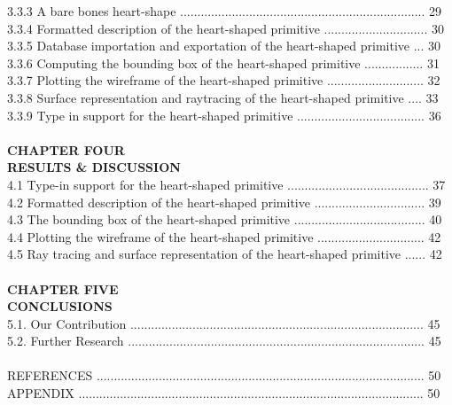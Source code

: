 \documentclass[11pt, oneside]{Thesis} %
\begin{document}
3.3.3 A bare bones heart-shape ....................................................................... 29\\
3.3.4 Formatted description of the heart-shaped primitive .............................. 30\\
3.3.5 Database importation and exportation of the heart-shaped primitive ... 30\\
3.3.6 Computing the bounding box of the heart-shaped primitive ................. 31\\
3.3.7 Plotting the wireframe of the heart-shaped primitive ............................ 32\\
3.3.8 Surface representation and raytracing of the heart-shaped primitive .... 33\\
3.3.9 Type in support for the heart-shaped primitive ..................................... 36\\\\
\hspace*{150}			\textbf{CHAPTER FOUR}\\
\hspace*{125}		 \textbf{RESULTS \& DISCUSSION}\\
4.1 Type-in support for the heart-shaped primitive ......................................... 37\\
4.2 Formatted description of the heart-shaped primitive ................................ 39\\
4.3 The bounding box of the heart-shaped primitive ......................................  40\\
4.4 Plotting the wireframe of the heart-shaped primitive ............................... 42\\
4.5 Ray tracing and surface representation of the heart-shaped primitive ...... 42\\\\
\hspace*{150}			\textbf{CHAPTER FIVE}\\
\hspace*{155}			\textbf{CONCLUSIONS}\\
5.1. Our Contribution ..................................................................................... 45\\
5.2. Further Research ...................................................................................... 45\\
\\
REFERENCES ............................................................................................... 50\\
APPENDIX .................................................................................................... 50\\
\end{document}

